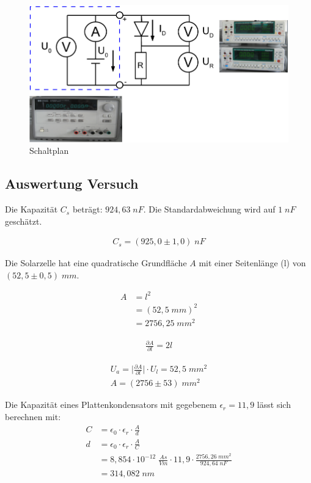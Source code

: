 \documentclass[a4paper]{scrartcl}
\numberwithin{equation}{subsection}
\begin{document}
\begin{figure}[H]
\includegraphics[width=16cm]{Schaltplan}
\centering
\caption{Schaltplan \cite{anl}}
\centering
\label{fig:Schaltplan}
\end{figure}

\newpage

\subsection{Auswertung Versuch}
Die Kapazität $C_s$ beträgt: $924,63\;nF$. Die Standardabweichung wird
auf $1\;nF$ geschätzt.

\begin{align*}
C_s = (925,0\pm 1,0)\;nF	
\end{align*}

Die Solarzelle hat eine quadratische Grundfläche $A$ mit einer Seitenlänge (l)
von $(52,5\pm 0,5)\;mm$.

\begin{align*}
A &= l^2 \\
 &= (52,5\;mm)^2 \\
 &= 2756,25\;mm^2
\end{align*}

\begin{align}
\frac{\partial A}{\partial l} = 2l
\end{align}

\begin{align*}
U_a = \bigg | \frac{\partial A}{\partial l} \bigg | \cdot U_l = 52,5\;mm^2 \\
A = (2756\pm 53)\;mm^2
\end{align*}

Die Kapazität eines Plattenkondensators mit gegebenem $\epsilon_r = 11,9$ lässt sich berechnen mit:
\begin{align*}
C &= \epsilon_0 \cdot \epsilon_r \cdot \frac{A}{d} \\
d &= \epsilon_0 \cdot \epsilon_r \cdot \frac{A}{C} \\
  &= 8,854 \cdot 10^{-12}\; \frac{As}{Vm} \cdot 11,9 \cdot \frac{2756,26 \; mm^2}{924,64 \; nF} \\
  &= 314,082 \; nm 
\end{align*}
\end{document}
